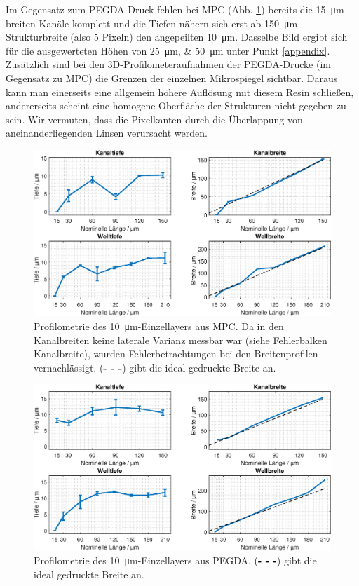 Im Gegensatz zum PEGDA-Druck fehlen bei MPC (Abb. \ref{fig:MPC_10um}) bereits die \SI{15}{\micro\meter} breiten Kanäle komplett und die Tiefen nähern sich erst ab \SI{150}{\micro\meter} Strukturbreite (also 5 Pixeln) den angepeilten \SI{10}{\micro\meter}. Dasselbe Bild ergibt sich für die ausgewerteten Höhen von \SIlist{25;50}{\micro\meter} unter Punkt \ref{appendix}. Zusätzlich sind bei den 3D-Profilometeraufnahmen der PEGDA-Drucke (im Gegensatz zu MPC) die Grenzen der einzelnen Mikrospiegel sichtbar.
Daraus kann man einerseits eine allgemein höhere Auflösung mit diesem Resin schließen, andererseits scheint eine homogene Oberfläche der Strukturen nicht gegeben zu sein. Wir vermuten, dass die Pixelkanten durch die Überlappung von aneinanderliegenden Linsen verursacht werden. \\
\clearpage
\begin{figure}[!h]
    \centering
    \includegraphics[width=\linewidth]{plot/10um_SL_ResolutionV1.eps}
    \caption{Profilometrie des \SI{10}{\micro\meter}-Einzellayers aus MPC. Da in den Kanalbreiten keine laterale Varianz messbar war (siehe Fehlerbalken Kanalbreite), wurden Fehlerbetrachtungen bei den Breitenprofilen vernachlässigt. (\textcolor{black}{\textbf{- - -}}) gibt die ideal gedruckte Breite an.}
    \label{fig:MPC_10um}
\end{figure}

\begin{figure}[!h]
    \centering
    \includegraphics[width=\linewidth]{plot/PEGDA_10um_SL_ResolutionV1.eps}
    \caption{Profilometrie des \SI{10}{\micro\meter}-Einzellayers aus PEGDA. (\textcolor{black}{\textbf{- - -}}) gibt die ideal gedruckte Breite an.}
    \label{fig:PEGDA_10um}
\end{figure}
\clearpage

